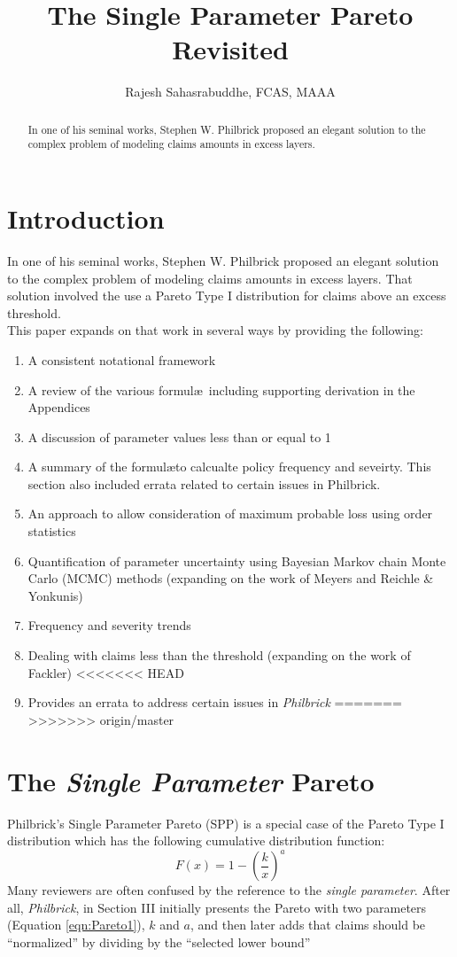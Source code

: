 \documentclass[]{article} %
\title{The Single Parameter Pareto Revisited}
\author{Rajesh Sahasrabuddhe, FCAS, MAAA}
\newcommand{\philbrick}{\textit{Philbrick}}
\begin{document}
\maketitle

\begin{abstract}
In one of his seminal works, Stephen W. Philbrick proposed an elegant solution to the complex problem of modeling claims amounts in excess layers. 

\end{abstract}

\section{Introduction}
In one of his seminal works, Stephen W. Philbrick\cite{Philbrick} proposed an elegant solution to the complex problem of modeling claims amounts in excess layers. That solution involved the use a Pareto Type I distribution for claims above an excess threshold.\\

This paper expands on that work in several ways by providing the following:
\begin{enumerate}
	\item A consistent notational framework
	\item A review of the various formul\ae~including supporting derivation in the Appendices
	\item A discussion of parameter values less than or equal to 1
	\item A summary of the formul\ae to calcualte policy frequency and seveirty. This section also included  errata related to certain issues in Philbrick.
	\item An approach to allow consideration of maximum probable loss using order statistics
	\item Quantification of parameter uncertainty using Bayesian Markov chain Monte Carlo (MCMC) methods (expanding on the work of Meyers and Reichle \& Yonkunis)
	\item Frequency and severity trends
	\item Dealing with claims less than the threshold (expanding on the work of Fackler)
<<<<<<< HEAD
	\item Provides an errata to address certain issues in \philbrick
=======
>>>>>>> origin/master
\end{enumerate}
\section{The \emph{Single Parameter} Pareto}\label{sec:theSPP}
Philbrick's Single Parameter Pareto (SPP) is a special case of the Pareto Type I distribution which has the following cumulative distribution function:
\begin{equation}
F(x) = 1 - \left(\frac{k}{x} \right)^a\label{eqn:Pareto1}
\end{equation}
Many reviewers are often confused by the reference to the \emph{single parameter}. After all, \philbrick, in Section III initially presents the Pareto with two parameters (Equation \ref{eqn:Pareto1}), $k$ and $a$, and then later adds that claims should be ``normalized'' by dividing by the ``selected lower bound''
\end{document}
